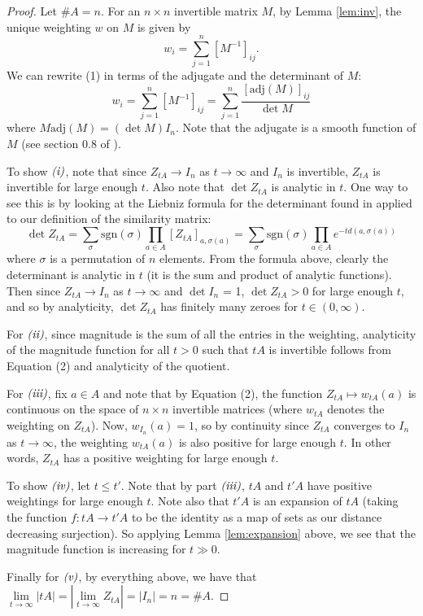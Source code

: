 \documentclass[11pt]{article}
\theoremstyle{mythm}
\begin{document}
\begin{proof}
Let $\#A = n$. For an $n \times n$ invertible matrix $M$, by Lemma \ref{lem:inv}, the unique weighting $w$ on $M$ is given by
\begin{equation}
w_i = \sum\limits_{j=1}^{n}\left[M^{-1}\right]_{ij}.
\end{equation}
We can rewrite (1) in terms of the adjugate and the determinant of $M$:
\begin{equation}
w_i = \sum\limits_{j=1}^{n}\left[M^{-1}\right]_{ij} = \sum\limits_{j=1}^{n} \frac{\left[\text{adj}(M)\right]_{ij}}{{\det{M}}}
\end{equation}
where $M\text{adj}(M) = (\det{M})I_n$. Note that the adjugate is a smooth function of $M$ (see section 0.8 of \cite{horn_matrix_2013}).

To show $\emph{(i)}$, note that since $Z_{tA} \to I_n$ as $t\to\infty$ and $I_n$ is invertible, $Z_{tA}$ is invertible for large enough $t$. Also note that $\det{Z_{tA}}$ is analytic in $t$. One way to see this is by looking at the Liebniz formula for the determinant found in \cite{horn_matrix_2013} applied to our definition of the similarity matrix:
\begin{equation*}
\det{Z_{tA}} = \sum\limits_{\sigma} \text{sgn}(\sigma)\prod\limits_{a\in A}\left[Z_{tA}\right]_{a,\sigma(a)} = \sum\limits_{\sigma}\text{sgn}(\sigma)\prod\limits_{a\in A} e^{-td(a,\sigma(a))}
\end{equation*}
where $\sigma$ is a permutation of $n$ elements. From the formula above, clearly the determinant is analytic in $t$ (it is the sum and product of analytic functions). Then since $Z_{tA} \to I_n$ as $t \to\infty$ and $\det I_n$ = 1, $\det Z_{tA} > 0$ for large enough $t$, and so by analyticity, $\det Z_{tA}$ has finitely many zeroes for $t \in (0,\infty)$.

For $\emph{(ii)}$, since magnitude is the sum of all the entries in the weighting, analyticity of the magnitude function for all $t > 0$ such that $tA$ is invertible follows from Equation (2) and analyticity of the quotient.

For $\emph{(iii)}$, fix $a \in A$ and note that by Equation (2), the function $Z_{tA} \mapsto w_{tA}(a)$ is continuous on the space of $n \times n$ invertible matrices (where $w_{tA}$ denotes the weighting on $Z_{tA}$). Now, $w_{I_n}(a) = 1$, so by continuity since $Z_{tA}$ converges to $I_n$ as $t \to \infty$, the weighting $w_{tA}(a)$ is also positive for large enough $t$. In other words, $Z_{tA}$ has a positive weighting for large enough $t$.

To show $\emph{(iv)}$, let $t \leq t'$. Note that by part $\emph{(iii)}$, $tA$ and $t'A$ have positive weightings for large enough $t$. Note also that $t'A$ is an expansion of $tA$ (taking the function $f:tA \to t'A$ to be the identity as a map of sets as our distance decreasing surjection). So applying Lemma \ref{lem:expansion} above, we see that the magnitude function is increasing for $t \gg 0$.

Finally for $\emph{(v)}$, by everything above, we have that $\lim\limits_{t\to\infty} \vert tA \vert = \left\vert \lim\limits_{t\to\infty}Z_{tA}\right\vert = \vert I_n\vert = n = \#A$.
\end{proof}
\end{document}
